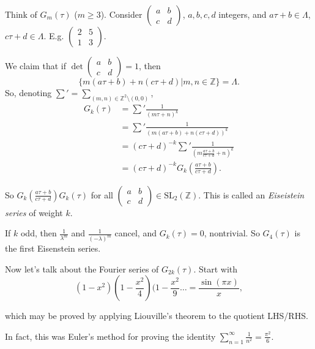 Think of $G_m(\tau)$ ($m\geq 3$).
Consider
$\begin{pmatrix}
a&b\\ 
c&d
\end{pmatrix}$,
$a,b,c,d$ integers,
and  $a\tau+b \in \Lambda$, $c\tau+d \in \Lambda$.
E.g. $\begin{pmatrix}
2&5\\ 
1&3
\end{pmatrix}$.

We claim that if $\det \begin{pmatrix}
a&b\\ 
c&d
\end{pmatrix}=1$,
then
$$
\{m(a\tau+b)+n(c\tau+d)|m,n\in \mathbb{Z}\}=\Lambda.
$$
So, denoting $\sum'=\sum_{(m,n) \in \mathbb{Z}^2\setminus(0,0)}$,
\begin{align*}
G_k(\tau)&=\sum'\frac{1}{(m\tau+n)^k}\\
&=\sum'\frac{1}{(m(a\tau+b)+n(c\tau+d))^k}\\
&=(c\tau+d)^{-k}\sum'\frac{1}{\left(
m\frac{a\tau+b}{c\tau+d}+n\right)^k}\\
&=(c\tau+d)^{-k}G_k\left(\frac{a\tau+b}{c\tau+d}\right).
\end{align*}

\noindent
So $G_k\left(\frac{a\tau+b}{c\tau+d}\right)G_k(\tau)$ 
for all $\begin{pmatrix}
a&b\\ 
c&d
\end{pmatrix}\in \text{SL}_2(\mathbb{Z})$.
This is called an {\it Eiseistein series} of weight $k$.

\begin{remark}
\label{remark-firs-eisestein-series}
If $k$ odd, then $\frac{1}{\lambda^m}$ and $\frac{1}{(-\lambda)^m}$ 
cancel, and $G_k(\tau)=0$, nontrivial.
So $G_4(\tau)$ is the first Eisenstein series.
\end{remark}

\medskip\noindent
Now let's talk about the Fourier series of $G_{2k}(\tau)$.
Start with
\begin{equation}
\label{equation-euler}
(1-x^2)(1-\frac{x^2}{4})(1-\frac{x^2}{9}\ldots=\frac{\sin(\pi x)}{x},
\end{equation}

\noindent
which may be proved by applying Liouville's theorem
to the quotient LHS/RHS.

In fact, this was Euler's method for proving the identity
$\sum_{n=1}^\infty \frac{1}{n^2}=\frac{\pi^2}{6}$.

